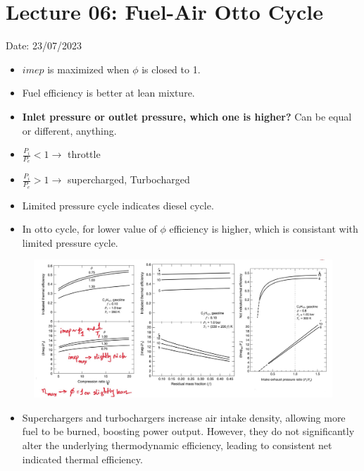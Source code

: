 \documentclass{article}
\begin{document}
	\section{Lecture 06: Fuel-Air Otto Cycle} 
	\hfill Date: 23/07/2023

	\begin{multicols}{2}
		\begin{itemize}
			\item $imep$ is maximized when $\phi$ is closed to 1. 
			\item Fuel efficiency is better at lean mixture.
			\item \textbf{Inlet pressure or outlet pressure, which one is higher?} Can be equal or different, anything.
			\item $\frac{P_i}{P_e} < 1 \rightarrow$ throttle 
			\item $\frac{P_i}{P_e} > 1 \rightarrow$ supercharged, Turbocharged 
			\item Limited pressure cycle indicates diesel cycle. 
			\item In otto cycle, for lower value of $\phi$ efficiency is higher, which is consistant with limited pressure cycle. 
		\end{itemize}
	\end{multicols}
	\begin{figure}[H]
		\begin{center}
			\includegraphics[width=\linewidth]{img/otto_cycle.jpeg}
		\end{center}
	\end{figure}
	\begin{itemize}
		\item Superchargers and turbochargers increase air intake density, allowing more fuel to be burned, boosting power output. However, they do not significantly alter the underlying thermodynamic efficiency, leading to consistent net indicated thermal efficiency.
	\end{itemize}
\end{document}
